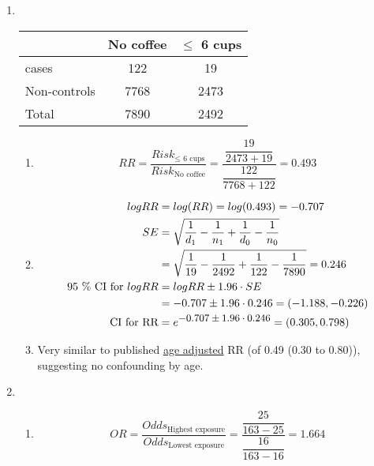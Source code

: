 \documentclass[12pt,a4paper,twoside]{article}
\begin{document}
\begin{enumerate}[label=\bfseries Q\arabic*.]


\item \ %

  \begin{center}
    \begin{tabular}{ l c c }
      & No coffee & $\le$ 6 cups \\ \hline
      cases        & 122       & 19           \\            
      Non-controls & 7768      & 2473         \\ \hline
      Total        & 7890      & 2492         \\
    \end{tabular}
  \end{center}  
  

  \begin{enumerate}
  \item
    \begin{equation*}
      RR= \frac{Risk_{ \le \text{ 6 cups}}}{Risk_{\text{No coffee}}}=\frac{\dfrac{19}{2473+19}}{\dfrac{122}{7768+122}}=0.493
    \end{equation*}
    
  \item 
    \begin{align*}
      logRR&=log(RR)=log(0.493)=-0.707 \\
      SE&=\sqrt{\frac{1}{d_{1}}-\frac{1}{n_{1}}+\frac{1}{d_{0}}-\frac{1}{n_{0}}}\\
           &=\sqrt{\frac{1}{19}-\frac{1}{2492}+\frac{1}{122}-\frac{1}{7890}}=0.246\\       
      \text{95 \% CI for }logRR &= logRR \pm 1.96 \cdot SE\\
           &= -0.707 \pm 1.96 \cdot 0.246 = (-1.188, -0.226)\\
      \text{CI for RR} &= e^{\mbox{\small$-0.707 \pm 1.96 \cdot 0.246$}}=(0.305, 0.798)
    \end{align*}
  \item      
    Very similar to published \underline{age adjusted} RR (of 0.49
    (0.30 to 0.80)), suggesting no confounding by age.
  \end{enumerate}

\item %
  \begin{enumerate}
  \item
    \begin{equation*}
      OR= \frac{Odds_{\text{Highest exposure}}}{Odds_{\text{Lowest
            exposure}}}
      =\frac{\dfrac{25}{163-25}}{\dfrac{16}{163-16}}=1.664
    \end{equation*}
    

\end{enumerate}
\end{enumerate}
\end{document}
